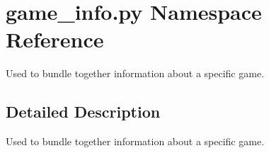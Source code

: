 \hypertarget{namespacegame__info_1_1py}{}\section{game\+\_\+info.\+py Namespace Reference}
\label{namespacegame__info_1_1py}


Used to bundle together information about a specific game.  




\subsection{Detailed Description}
Used to bundle together information about a specific game. 